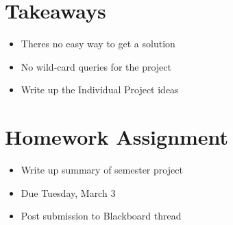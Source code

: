 \documentclass{article}
\begin{document}
\section{Takeaways}
\begin{itemize}
    \item Theres no easy way to get a solution
    \item No wild-card queries for the project
    \item Write up the Individual Project ideas
\end{itemize}{}


\section{Homework Assignment}
\begin{itemize}
	\item Write up summary of semester project
	\item Due Tuesday, March 3
	\item Post submission to Blackboard thread
\end{itemize}{}
\end{document}
